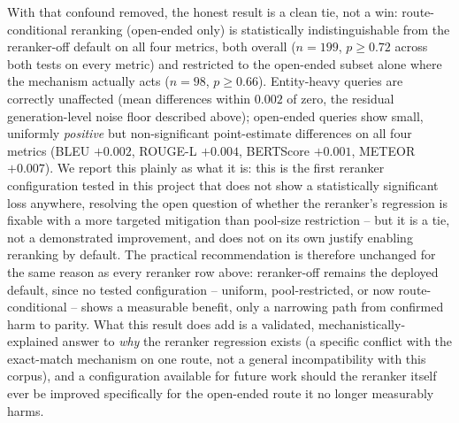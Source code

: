 \documentclass[a4paper,twoside]{article}
\begin{document}
With that confound removed, the honest result is a clean tie, not a win: route-conditional reranking (open-ended only) is statistically indistinguishable from the reranker-off default on all four metrics, both overall ($n=199$, $p\geq0.72$ across both tests on every metric) and restricted to the open-ended subset alone where the mechanism actually acts ($n=98$, $p\geq0.66$). Entity-heavy queries are correctly unaffected (mean differences within $0.002$ of zero, the residual generation-level noise floor described above); open-ended queries show small, uniformly \emph{positive} but non-significant point-estimate differences on all four metrics (BLEU $+0.002$, ROUGE-L $+0.004$, BERTScore $+0.001$, METEOR $+0.007$). We report this plainly as what it is: this is the first reranker configuration tested in this project that does not show a statistically significant loss anywhere, resolving the open question of whether the reranker's regression is fixable with a more targeted mitigation than pool-size restriction -- but it is a tie, not a demonstrated improvement, and does not on its own justify enabling reranking by default. The practical recommendation is therefore unchanged for the same reason as every reranker row above: reranker-off remains the deployed default, since no tested configuration -- uniform, pool-restricted, or now route-conditional -- shows a measurable benefit, only a narrowing path from confirmed harm to parity. What this result does add is a validated, mechanistically-explained answer to \emph{why} the reranker regression exists (a specific conflict with the exact-match mechanism on one route, not a general incompatibility with this corpus), and a configuration available for future work should the reranker itself ever be improved specifically for the open-ended route it no longer measurably harms.
\end{document}
